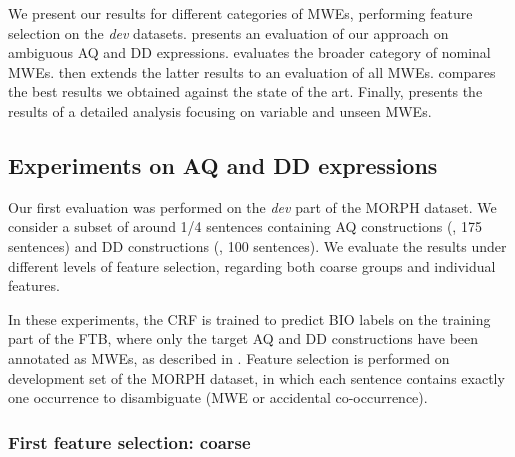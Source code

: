 \documentclass[output=paper,modfonts]{langscibook}
\begin{document}
We present our results for different categories of MWEs, performing  feature selection on the \emph{dev} datasets. 
 presents an evaluation of our approach on ambiguous AQ and DD expressions. 
 evaluates the broader category of nominal MWEs. 
 then extends the latter results to an evaluation of all MWEs. 
 compares the best results we obtained against the state of the art.
Finally,  presents the results of a detailed analysis focusing on variable and unseen MWEs.


\subsection{Experiments on AQ and DD expressions}
\label{schol:sec:results-ambig}

Our first evaluation was performed on the \emph{dev} part of the MORPH dataset. We consider a subset of around 1/4 sentences containing AQ constructions (\devAQ{}, 175 sentences) and DD constructions (\devDD{}, 100 sentences).
We evaluate the results under different levels of feature selection, regarding both coarse groups and individual features.

In these experiments, the CRF is trained to predict BIO labels on the training part of the FTB, where only the target AQ and DD constructions have been annotated as MWEs, as described in . Feature selection is performed on development set of the MORPH dataset, in which each sentence contains exactly one occurrence to disambiguate (MWE or accidental co-occurrence).


\subsubsection{First feature selection: coarse}
\label{subsec:results-ambig-feat-coarse}
\end{document}
